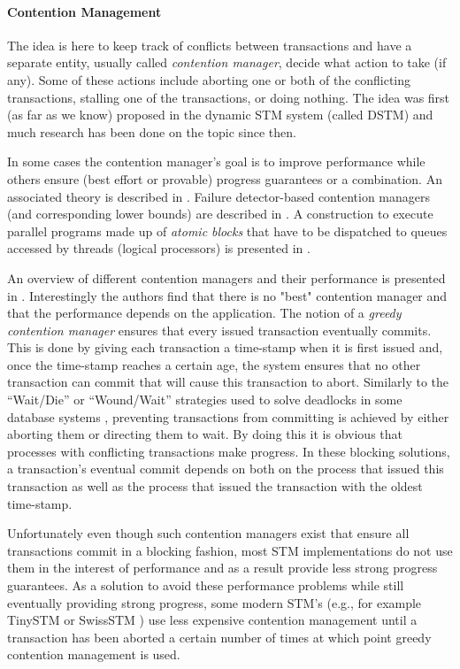 \paragraph{Contention Management} The idea is here to keep
track of conflicts between transactions and have a separate entity, usually
called {\it contention manager}, decide what action to take (if any). 
Some  of these  actions include  aborting one  or both  of  the conflicting
transactions, stalling one of the transactions, or doing nothing. 
The idea  was  first (as far as we know) proposed  in  the dynamic 
STM system (called DSTM) \cite{HLMS03} and much research has been done on the
topic since then. 

In some cases the contention manager's goal is to improve performance
while others
ensure (best effort or provable) progress guarantees or a combination. 
An associated theory is described in \cite{GHP05}. 
Failure detector-based contention managers (and corresponding 
lower bounds) are described in \cite{GKK08}. 
A construction to execute  parallel programs made up of {\it atomic blocks} 
that have to be dispatched to queues accessed by threads (logical processors) 
is presented in \cite{WF10}. 

An overview  of different contention managers and their performance is
presented  in \cite{GHP05}. Interestingly the authors find that there is no 
"best" contention manager and that the performance depends on the application. 
The notion of a {\it greedy contention manager} 
ensures that every issued transaction  eventually commits. 
This  is done  by giving  each transaction  a time-stamp  when it  is first
issued and,  once the  time-stamp reaches a  certain age, the  system ensures
that no  other transaction can commit  that will cause  this transaction to
abort.  Similarly to  the ``Wait/Die''  or ``Wound/Wait''
strategies used to solve deadlocks in some database systems  \cite{RSL78}, 
preventing  transactions from committing is  achieved by either
aborting them or directing them to wait. 
By  doing  this it  is  obvious  that  processes  with  conflicting
transactions  make progress.
In these blocking solutions, a transaction's eventual commit depends
on both on the  process that issued this transaction as well as the process
that issued the transaction  with the oldest time-stamp.

Unfortunately even though such contention managers exist that ensure
all transactions commit in a blocking fashion, most
STM implementations do not use them in the interest of performance
and as a result provide less strong progress guarantees.
As a solution to avoid these performance problems while still
eventually providing strong progress,  some modern  STM's (e.g., for example  
TinySTM  \cite{FFR08}   or  SwissSTM   \cite{DGK09})  use   less  expensive
contention  management  until  a transaction  has been  aborted a  certain
number  of times  at  which point greedy contention management is used. 

